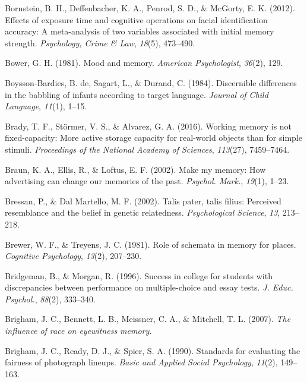 \documentclass[
]{krantz}
\newlength{\cslhangindent}
\newlength{\cslentryspacingunit} %
\newenvironment{CSLReferences}[2] %
 {%
  \setlength{\parindent}{0pt}
  \ifodd #1
  \let\oldpar\par
  \def\par{\hangindent=\cslhangindent\oldpar}
  \fi
  \setlength{\parskip}{#2\cslentryspacingunit}
 }%
 {}
\begin{document}
\begin{CSLReferences}{1}{0}
\leavevmode{}%
Bornstein, B. H., Deffenbacher, K. A., Penrod, S. D., \& McGorty, E. K. (2012). Effects of exposure time and cognitive operations on facial identification accuracy: A meta-analysis of two variables associated with initial memory strength. \emph{Psychology, Crime \& Law}, \emph{18}(5), 473--490.

\leavevmode{}%
Bower, G. H. (1981). Mood and memory. \emph{American Psychologist}, \emph{36}(2), 129.

\leavevmode{}%
Boysson-Bardies, B. de, Sagart, L., \& Durand, C. (1984). Discernible differences in the babbling of infants according to target language. \emph{Journal of Child Language}, \emph{11}(1), 1--15.

\leavevmode{}%
Brady, T. F., Störmer, V. S., \& Alvarez, G. A. (2016). Working memory is not fixed-capacity: More active storage capacity for real-world objects than for simple stimuli. \emph{Proceedings of the National Academy of Sciences}, \emph{113}(27), 7459--7464.

\leavevmode{}%
Braun, K. A., Ellis, R., \& Loftus, E. F. (2002). Make my memory: How advertising can change our memories of the past. \emph{Psychol. Mark.}, \emph{19}(1), 1--23.

\leavevmode{}%
Bressan, P., \& Dal Martello, M. F. (2002). Talis pater, talis filius: Perceived resemblance and the belief in genetic relatedness. \emph{Psychological Science}, \emph{13}, 213--218.

\leavevmode{}%
Brewer, W. F., \& Treyens, J. C. (1981). Role of schemata in memory for places. \emph{Cognitive Psychology}, \emph{13}(2), 207--230.

\leavevmode{}%
Bridgeman, B., \& Morgan, R. (1996). Success in college for students with discrepancies between performance on multiple-choice and essay tests. \emph{J. Educ. Psychol.}, \emph{88}(2), 333--340.

\leavevmode{}%
Brigham, J. C., Bennett, L. B., Meissner, C. A., \& Mitchell, T. L. (2007). \emph{The influence of race on eyewitness memory.}

\leavevmode{}%
Brigham, J. C., Ready, D. J., \& Spier, S. A. (1990). Standards for evaluating the fairness of photograph lineups. \emph{Basic and Applied Social Psychology}, \emph{11}(2), 149--163.


\end{CSLReferences}
\end{document}
